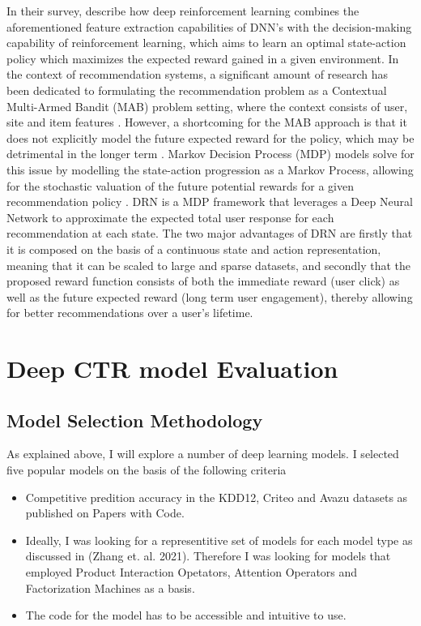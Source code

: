 \documentclass{mldsmsc}
\begin{document}
In their survey, \citep{RefWorks:wang2024deep} describe how deep reinforcement learning combines 
the aforementioned feature extraction capabilities of DNN’s with the decision-making 
capability of reinforcement learning, which aims to learn an optimal state-action policy 
which maximizes the expected reward gained in a given environment. In the context of 
recommendation systems, a significant amount of research has been dedicated to formulating 
the recommendation problem as a Contextual Multi-Armed Bandit (MAB) problem setting, where 
the context consists of user, site and item features \citep{RefWorks:bouneffouf2012contextual-bandit,RefWorks:li2010contextual-bandit,RefWorks:zeng2016online}. 
However, a shortcoming for the MAB approach 
is that it does not explicitly model the future expected reward for the policy, which may 
be detrimental in the longer term \citep{RefWorks:zheng2018drn:}. Markov Decision Process (MDP) models 
solve for this issue by modelling the state-action progression as a Markov Process, allowing 
for the stochastic valuation of the future potential rewards for a given recommendation 
policy \citep{RefWorks:lu2016partially,RefWorks:mahmood2007learning}. DRN \citep{RefWorks:zheng2018drn:} is a MDP framework 
that leverages a Deep Neural Network to approximate the expected total user response for 
each recommendation at each state. The two major advantages of DRN are firstly that it is 
composed on the basis of a continuous state and action representation, meaning that it can 
be scaled to large and sparse datasets, and secondly that the proposed reward function 
consists of both the immediate reward (user click) as well as the future expected reward 
(long term user engagement), thereby allowing for better recommendations over a user’s 
lifetime.

\chapter{Deep CTR model Evaluation}
\label{chap:deep-ctr-model-evaluation}

\section{Model Selection Methodology}

As explained above, I will explore a number of deep learning models. I selected five popular models on the basis of the following criteria

\begin{itemize}
\item Competitive predition accuracy in the KDD12, Criteo and Avazu datasets as published on Papers with Code.
\item Ideally, I was looking for a representitive set of models for each model type as discussed in (Zhang et. al. 2021). Therefore I was looking for models that employed Product Interaction Opetators, Attention Operators and Factorization Machines as a basis.
\item The code for the model has to be accessible and intuitive to use.
\end{itemize}
\end{document}
